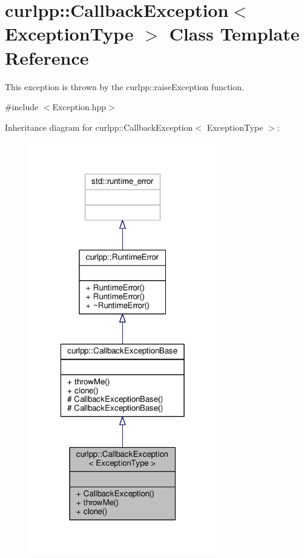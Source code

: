 \hypertarget{classcurlpp_1_1CallbackException}{\section{curlpp\-:\-:Callback\-Exception$<$ Exception\-Type $>$ Class Template Reference}
\label{classcurlpp_1_1CallbackException}
}


This exception is thrown by the curlpp\-::raise\-Exception function.  




{\ttfamily \#include $<$Exception.\-hpp$>$}



Inheritance diagram for curlpp\-:\-:Callback\-Exception$<$ Exception\-Type $>$\-:\nopagebreak
\begin{figure}[H]
\begin{center}
\leavevmode
\includegraphics[width=232pt]{classcurlpp_1_1CallbackException__inherit__graph}
\end{center}
\end{figure}


